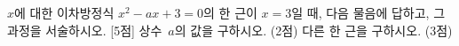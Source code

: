 $x$에 대한 이차방정식 $x^2-ax+3=0$의 한 근이 $x=3$일 때, 다음 물음에 답하고, 그 과정을 서술하시오. \mbox{[5점]}
 상수~$a$의 값을 구하시오. (2점)
 다른 한 근을 구하시오. (3점)
